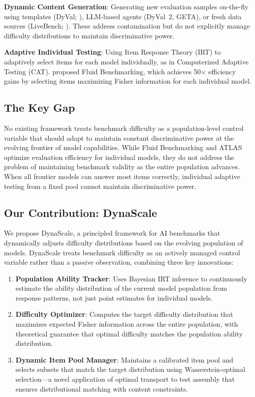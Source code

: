 \documentclass{article}
\begin{document}
\textbf{Dynamic Content Generation}: Generating new evaluation samples on-the-fly using templates (DyVal; \citealp{zhu2024dyval}), LLM-based agents (DyVal~2, GETA), or fresh data sources (LiveBench; \citealp{white2025livebench}). These address contamination but do not explicitly manage difficulty distributions to maintain discriminative power.

\textbf{Adaptive Individual Testing}: Using Item Response Theory (IRT) to adaptively select items for each model individually, as in Computerized Adaptive Testing (CAT). \citet{hofmann2025fluid} proposed Fluid Benchmarking, which achieves 50$\times$ efficiency gains by selecting items maximizing Fisher information for each individual model.

\subsection{The Key Gap}

No existing framework treats benchmark difficulty as a population-level control variable that should adapt to maintain constant discriminative power at the evolving frontier of model capabilities. While Fluid Benchmarking and ATLAS \citep{li2025atlas} optimize evaluation efficiency for individual models, they do not address the problem of maintaining benchmark validity as the entire population advances. When all frontier models can answer most items correctly, individual adaptive testing from a fixed pool cannot maintain discriminative power.

\subsection{Our Contribution: DynaScale}

We propose DynaScale, a principled framework for AI benchmarks that dynamically adjusts difficulty distributions based on the evolving population of models. DynaScale treats benchmark difficulty as an actively managed control variable rather than a passive observation, combining three key innovations:

\begin{enumerate}
    \item \textbf{Population Ability Tracker}: Uses Bayesian IRT inference to continuously estimate the ability distribution of the current model population from response patterns, not just point estimates for individual models.
    
    \item \textbf{Difficulty Optimizer}: Computes the target difficulty distribution that maximizes expected Fisher information across the entire population, with theoretical guarantee that optimal difficulty matches the population ability distribution.
    
    \item \textbf{Dynamic Item Pool Manager}: Maintains a calibrated item pool and selects subsets that match the target distribution using Wasserstein-optimal selection---a novel application of optimal transport to test assembly that ensures distributional matching with content constraints.
\end{enumerate}
\end{document}
